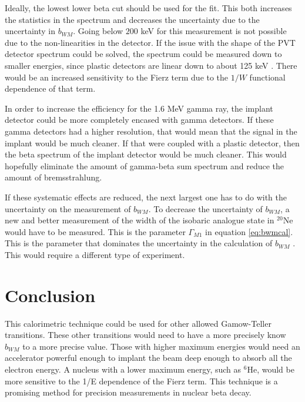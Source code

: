 \documentclass[../MaxHughesThesis.tex]{subfiles}
\begin{document}
Ideally, the lowest lower beta cut should be used for the fit.
This both increases the statistics in the spectrum and decreases the uncertainty due to the uncertainty in $b_{WM}$.
Going below $200$ keV for this measurement is not possible due to the non-linearities in the detector.
If the issue with the shape of the PVT detector spectrum could be solved, the spectrum could be measured down to smaller energies, since plastic detectors are linear down to about 125 keV \cite{Kno10}. 
There would be an increased sensitivity to the Fierz term due to the $1/W$ functional dependence of that term.

In order to increase the efficiency for the 1.6 MeV gamma ray, the implant detector could be more completely encased with gamma detectors.
If these gamma detectors had a higher resolution, that would mean that the signal in the implant would be much cleaner.
If that were coupled with a plastic detector, then the beta spectrum of the implant detector would be much cleaner.
This would hopefully eliminate the amount of gamma-beta sum spectrum and reduce the amount of bremsstrahlung.

If these systematic effects are reduced, the next largest one has to do with the uncertainty on the measurement of $b_{WM}$.
To decrease the uncertainty of $b_{WM}$,  a new and better measurement of the width of the isobaric analogue state in $^{20}$Ne would have to be measured.
This is the parameter $\Gamma_{M1}$ in equation \ref{eq:bwmcal}.
This is the parameter that dominates the uncertainty in  the calculation of $b_{WM}$ \cite{Min11}.
This would require a different type of experiment.

\section{Conclusion}
This calorimetric technique could be used for other allowed Gamow-Teller transitions.
These other transitions would need to have a more precisely know $b_{WM}$ to a more precise value.
Those with higher maximum energies would need an accelerator powerful enough to implant the beam deep enough to absorb all the electron energy.
A nucleus with a lower maximum energy, such as $^{6}$He, would be more sensitive to the 1/E dependence of the Fierz term. 
This technique is a promising method for precision measurements in nuclear beta decay.
\end{document}
